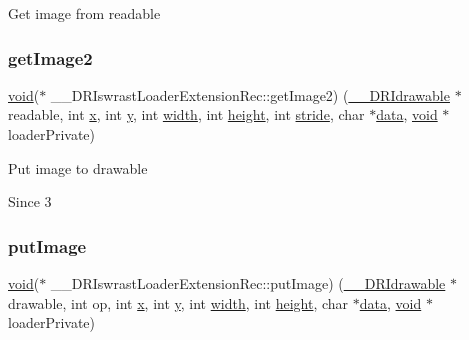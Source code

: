 Get image from readable \mbox{\label{struct_____d_r_iswrast_loader_extension_rec_acc92c35c1d89f7f05d835cf8a905a3e4}} 
\subsubsection{\texorpdfstring{get\+Image2}{getImage2}}
{\footnotesize\ttfamily \hyperlink{_s_d_l__opengles2__gl2ext_8h_ae5d8fa23ad07c48bb609509eae494c95}{void}($\ast$ \+\_\+\+\_\+\+D\+R\+Iswrast\+Loader\+Extension\+Rec\+::get\+Image2) (\hyperlink{dri__interface_8h_a5bfb832a0a08208d95b3bbef439d2262}{\+\_\+\+\_\+\+D\+R\+Idrawable} $\ast$readable, int \hyperlink{gl_8h_ad0e63d0edcdbd3d79554076bf309fd47}{x}, int \hyperlink{gl_8h_a1675d9d7bb68e1657ff028643b4037e3}{y}, int \hyperlink{gl_8h_a9a82cf3caff84cabc4598e2619faac17}{width}, int \hyperlink{gl_8h_aa352f2804b9902ac30769c00dde75d5f}{height}, int \hyperlink{glcorearb_8h_a743715bb319dd426e85b9774559cc0ea}{stride}, char $\ast$\hyperlink{gl_8h_a2e335d56e2846b0fea47eed068b2d34a}{data}, \hyperlink{_s_d_l__opengles2__gl2ext_8h_ae5d8fa23ad07c48bb609509eae494c95}{void} $\ast$loader\+Private)}

Put image to drawable

\begin{DoxySince}{Since}
3 
\end{DoxySince}
\mbox{\label{struct_____d_r_iswrast_loader_extension_rec_a9c1f99c2a8270652f8637e1e415bbd0a}} 
\subsubsection{\texorpdfstring{put\+Image}{putImage}}
{\footnotesize\ttfamily \hyperlink{_s_d_l__opengles2__gl2ext_8h_ae5d8fa23ad07c48bb609509eae494c95}{void}($\ast$ \+\_\+\+\_\+\+D\+R\+Iswrast\+Loader\+Extension\+Rec\+::put\+Image) (\hyperlink{dri__interface_8h_a5bfb832a0a08208d95b3bbef439d2262}{\+\_\+\+\_\+\+D\+R\+Idrawable} $\ast$drawable, int op, int \hyperlink{gl_8h_ad0e63d0edcdbd3d79554076bf309fd47}{x}, int \hyperlink{gl_8h_a1675d9d7bb68e1657ff028643b4037e3}{y}, int \hyperlink{gl_8h_a9a82cf3caff84cabc4598e2619faac17}{width}, int \hyperlink{gl_8h_aa352f2804b9902ac30769c00dde75d5f}{height}, char $\ast$\hyperlink{gl_8h_a2e335d56e2846b0fea47eed068b2d34a}{data}, \hyperlink{_s_d_l__opengles2__gl2ext_8h_ae5d8fa23ad07c48bb609509eae494c95}{void} $\ast$loader\+Private)}

